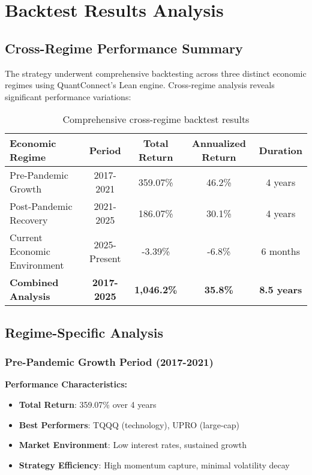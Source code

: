 \documentclass[onecolumn,11pt]{IEEEtran}
\begin{document}
\section{Backtest Results Analysis}

\subsection{Cross-Regime Performance Summary}

The strategy underwent comprehensive backtesting across three distinct economic regimes using QuantConnect's Lean engine. Cross-regime analysis reveals significant performance variations:

\begin{table}[h]
\centering
\begin{tabular}{lcccc}
\toprule
\textbf{Economic Regime} & \textbf{Period} & \textbf{Total Return} & \textbf{Annualized Return} & \textbf{Duration} \\
\midrule
Pre-Pandemic Growth & 2017-2021 & 359.07\% & 46.2\% & 4 years \\
Post-Pandemic Recovery & 2021-2025 & 186.07\% & 30.1\% & 4 years \\
Current Economic Environment & 2025-Present & -3.39\% & -6.8\% & 6 months \\
\midrule
\textbf{Combined Analysis} & \textbf{2017-2025} & \textbf{1,046.2\%} & \textbf{35.8\%} & \textbf{8.5 years} \\
\bottomrule
\end{tabular}
\caption{Comprehensive cross-regime backtest results}
\end{table}

\subsection{Regime-Specific Analysis}

\subsubsection{Pre-Pandemic Growth Period (2017-2021)}
\textbf{Performance Characteristics:}
\begin{itemize}
    \item \textbf{Total Return}: 359.07\% over 4 years
    \item \textbf{Best Performers}: TQQQ (technology), UPRO (large-cap)
    \item \textbf{Market Environment}: Low interest rates, sustained growth
    \item \textbf{Strategy Efficiency}: High momentum capture, minimal volatility decay
\end{itemize}
\end{document}
